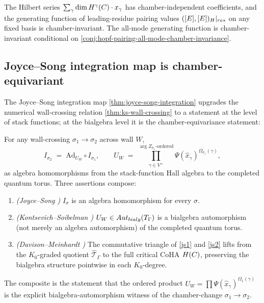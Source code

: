 \begin{corollary}
  \label{cor:hilbert-series-chamber-indep}
  The Hilbert series $\sum_\gamma \dim H^\gamma(C) \cdot x_\gamma$
  has chamber-independent coefficients, and the generating function of
  leading-residue pairing values $([E], [E])_{H}|_{res}$ on any
  fixed basis is chamber-invariant. The all-mode generating function is
  chamber-invariant conditional on
  \cref{conj:hopf-pairing-all-mode-chamber-invariance}.
\end{corollary}

\subsection{Joyce--Song integration map is chamber-equivariant}
\label{subsec:js-integration-chamber-equivariance}

The Joyce--Song integration map \cref{thm:joyce-song-integration} upgrades
the numerical wall-crossing relation \cref{thm:ks-wall-crossing} to a
statement at the level of stack functions; at the bialgebra level it is
the chamber-equivariance statement:

\begin{theorem}
  \label{thm:js-bialgebra-chamber-equivariance}
  For any wall-crossing $\sigma_1 \to \sigma_2$ across wall $W$,
  \[
    I_{\sigma_2} \;=\; \mathrm{Ad}_{U_W} \circ I_{\sigma_1},
    \qquad
    U_W \;=\; \prod_{\gamma \in V^+}^{\arg Z_{\sigma_1}\text{-ordered}}
      \Psi(\hat{x}_\gamma)^{\Omega_{\sigma_1}(\gamma)},
  \]
  as algebra homomorphisms from the stack-function Hall algebra to the
  completed quantum torus. Three assertions compose:
  \begin{enumerate}[leftmargin=2em]
    \item\label{js1} \emph{(Joyce--Song \cite[Thm 5.8]{JoyceSong2012})} $I_\sigma$
          is an algebra homomorphism for every $\sigma$.
    \item\label{js2} \emph{(Kontsevich--Soibelman \cite[\S 6.3]{KS2008})}
          $U_W \in Aut_{bialg}(T_\Gamma)$ is a bialgebra
          automorphism (not merely an algebra automorphism) of the
          completed quantum torus.
    \item\label{js3} \emph{(Davison--Meinhardt \cite{DavisonMeinhardt2020})}
          The commutative triangle of \ref{js1} and \ref{js2} lifts from
          the $K_0$-graded quotient $\hat{\mathcal{T}}_\Gamma$ to the full critical CoHA
          $H(C)$, preserving the bialgebra structure pointwise in
          each $K_0$-degree.
  \end{enumerate}
  The composite is the statement that the ordered product
  $U_W = \prod \Psi(\hat{x}_\gamma)^{\Omega_1(\gamma)}$ is the explicit
  bialgebra-automorphism witness of the chamber-change $\sigma_1 \to \sigma_2$.
\end{theorem}

